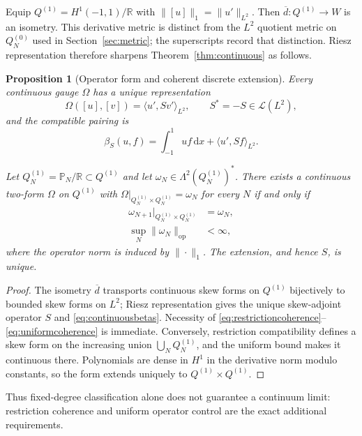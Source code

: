 \documentclass[11pt,a4paper]{article}
\newtheorem{proposition}[theorem]{Proposition}
\theoremstyle{definition}
\theoremstyle{remark}
\newcommand{\R}{\mathbb{R}}
\newcommand{\Pp}{\mathbb{P}}
\newcommand{\dd}{\,\mathrm{d}}
\begin{document}
Equip $Q^{(1)}=H^1(-1,1)/\R$ with
$\|[u]\|_1=\|u'\|_{L^2}$.  Then $\overline d:Q^{(1)}\to W$ is an isometry.  This derivative
metric is distinct from the $L^2$ quotient metric on $Q_N^{(0)}$ used in
Section~\ref{sec:metric}; the superscripts record that distinction.  Riesz representation
therefore sharpens Theorem~\ref{thm:continuous} as follows.

\begin{proposition}[Operator form and coherent discrete extension]
\label{prop:coherentextension}
Every continuous gauge $\Omega$ has a unique representation
\begin{equation}\label{eq:continuousoperatorform}
 \Omega([u],[v])=\langle u',Sv'\rangle_{L^2},
 \qquad S^*=-S\in\mathcal L(L^2),
\end{equation}
and the compatible pairing is
\begin{equation}\label{eq:continuousbetas}
 \beta_S(u,f)=\int_{-1}^{1}uf\dd x+\langle u',Sf\rangle_{L^2}.
\end{equation}

Let $Q_N^{(1)}=\Pp_N/\R\subset Q^{(1)}$ and let
$\omega_N\in\Lambda^2(Q_N^{(1)})^*$.  There exists a continuous two-form $\Omega$ on
$Q^{(1)}$ with $\Omega|_{Q_N^{(1)}\times Q_N^{(1)}}=\omega_N$ for every $N$ if and only if
\begin{align}
 \omega_{N+1}|_{Q_N^{(1)}\times Q_N^{(1)}}&=\omega_N,
 \label{eq:restrictioncoherence}\\
 \sup_N\|\omega_N\|_{\mathrm{op}}&<\infty,
 \label{eq:uniformcoherence}
\end{align}
where the operator norm is induced by $\|\cdot\|_1$.  The extension, and hence $S$, is
unique.
\end{proposition}

\begin{proof}
The isometry $\overline d$ transports continuous skew forms on $Q^{(1)}$ bijectively to bounded
skew forms on $L^2$; Riesz representation gives the unique skew-adjoint operator $S$ and
\eqref{eq:continuousbetas}.  Necessity of
\eqref{eq:restrictioncoherence}--\eqref{eq:uniformcoherence} is immediate.  Conversely,
restriction compatibility defines a skew form on the increasing union
$\bigcup_NQ_N^{(1)}$, and the uniform bound makes it continuous there.  Polynomials are dense
in $H^1$ in the derivative norm modulo constants, so the form extends uniquely to
$Q^{(1)}\times Q^{(1)}$.
\end{proof}

Thus fixed-degree classification alone does not guarantee a continuum limit: restriction
coherence and uniform operator control are the exact additional requirements.
\end{document}

